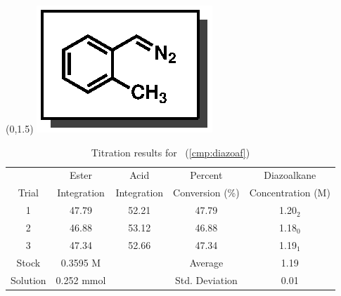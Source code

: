 \begin{singlespace}
\begin{table}[htbp]
\begin{textblock}{1}(0,1.5)
\includegraphics[scale=0.8]{chp_asymmetric/images/diazoaf}
\end{textblock}
\flushright
{\small
\begin{tabular}{ccccc} 
\toprule
&Ester&Acid&Percent&Diazoalkane\\
Trial&Integration&Integration&Conversion (\%)&Concentration (M) \\ 
\midrule
1 & 47.79 & 52.21 & 47.79 & 1.20$_2$ \\
2 & 46.88 & 53.12 & 46.88 & 1.18$_0$ \\
3 & 47.34 & 52.66 & 47.34 & 1.19$_1$ \\
\midrule
Stock & 0.3595 M & & Average & 1.19 \\
Solution & 0.252 mmol & & Std. Deviation & 0.01 \\
\bottomrule
\end{tabular}
\caption{Titration results for \CMPdiazoaf~(\ref{cmp:diazoaf})}
}
\end{table}
\end{singlespace}

